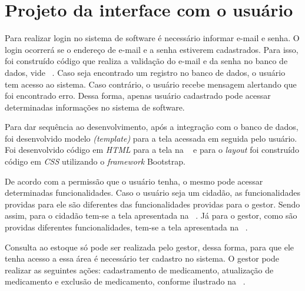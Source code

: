\section{Projeto da interface com o usuário}

Para realizar login no sistema de software é necessário informar e-mail e senha. O login ocorrerá se o endereço de e-mail e a senha estiverem cadastrados. Para isso, foi construído código que realiza a validação do e-mail e da senha no banco de dados, vide ~. Caso seja encontrado um registro no banco de dados, o usuário tem acesso ao sistema. Caso contrário, o usuário recebe mensagem alertando que foi encontrado erro. Dessa forma, apenas usuário cadastrado pode acessar determinadas informações no sistema de software. 

%

Para dar sequência ao desenvolvimento, após a integração com o banco de dados, foi desenvolvido  modelo \emph{(template)} para a tela acessada em seguida pelo usuário. Foi desenvolvido código em \emph{\acrfull{HTML}} para a tela na ~ e para o \emph{layout} foi construído código em \emph{\acrfull{CSS}} utilizando o \emph{framework} Bootstrap. 


%

%

%

De acordo com a permissão que o usuário tenha, o mesmo pode acessar determinadas funcionalidades. Caso o usuário seja um cidadão, as funcionalidades providas para ele são diferentes das funcionalidades providas para o gestor. Sendo assim, para o cidadão tem-se a tela apresentada na ~. Já para o gestor, como são providas diferentes funcionalidades, tem-se a tela apresentada na ~.

%

Consulta ao estoque só pode ser realizada pelo gestor, dessa forma, para que ele tenha acesso a essa área é necessário ter cadastro no sistema. O gestor pode realizar as seguintes ações: cadastramento de medicamento, atualização de medicamento e exclusão de medicamento, conforme ilustrado na ~.


